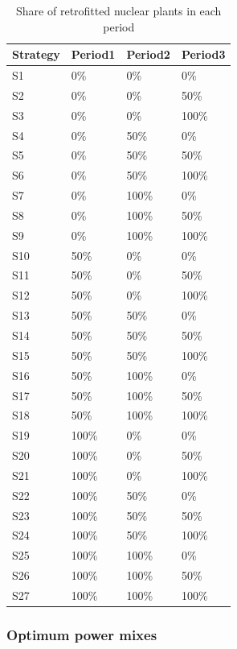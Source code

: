 \begin{table}[!hb]
	\centering
	\caption{Share of retrofitted nuclear plants in each period}
	\label{tab:shareNukeRetrofit}
	\small
	\begin{tabular}{llll}
		\toprule
		Strategy & Period1 & Period2 & Period3 \\
		\midrule
		S1 & 0\% & 0\% & 0\% \\
		S2 & 0\% & 0\% & 50\% \\
		S3 & 0\% & 0\% & 100\% \\
		S4 & 0\% & 50\% & 0\% \\
		S5 & 0\% & 50\% & 50\% \\
		S6 & 0\% & 50\% & 100\% \\
		S7 & 0\% & 100\% & 0\% \\
		S8 & 0\% & 100\% & 50\% \\
		S9 & 0\% & 100\% & 100\% \\
		S10 & 50\% & 0\% & 0\% \\
		S11 & 50\% & 0\% & 50\% \\
		S12 & 50\% & 0\% & 100\% \\
		S13 & 50\% & 50\% & 0\% \\
		S14 & 50\% & 50\% & 50\% \\
		S15 & 50\% & 50\% & 100\% \\
		S16 & 50\% & 100\% & 0\% \\
		S17 & 50\% & 100\% & 50\% \\
		S18 & 50\% & 100\% & 100\% \\
		S19 & 100\% & 0\% & 0\% \\
		S20 & 100\% & 0\% & 50\% \\
		S21 & 100\% & 0\% & 100\% \\
		S22 & 100\% & 50\% & 0\% \\
		S23 & 100\% & 50\% & 50\% \\
		S24 & 100\% & 50\% & 100\% \\
		S25 & 100\% & 100\% & 0\% \\
		S26 & 100\% & 100\% & 50\% \\
		S27 & 100\% & 100\% & 100\% \\
		\bottomrule
	\end{tabular}
\end{table}

\clearpage

\subsubsection{Optimum power mixes}
\label{app:optimumMixes}

